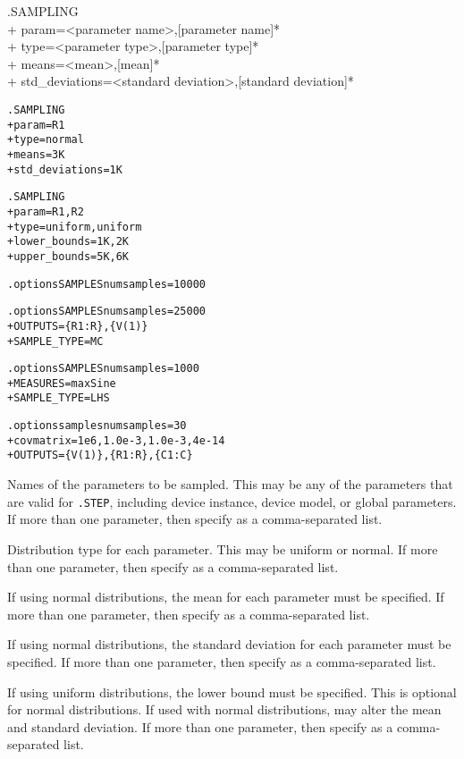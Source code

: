 \begin{Command}
\format
.SAMPLING  \\
+ param=<parameter name>,[parameter name]*  \\
+ type=<parameter type>,[parameter type]*  \\
+ means=<mean>,[mean]*  \\
+ std\_deviations=<standard deviation>,[standard deviation]* 

\examples
\begin{alltt}
.SAMPLING
+ param=R1
+ type=normal
+ means=3K
+ std\_deviations=1K

.SAMPLING
+ param=R1,R2
+ type=uniform,uniform
+ lower\_bounds=1K,2K
+ upper\_bounds=5K,6K

.options SAMPLES numsamples=10000

.options SAMPLES numsamples=25000
+ OUTPUTS=\{R1:R\},\{V(1)\}
+ SAMPLE\_TYPE=MC

.options SAMPLES numsamples=1000
+ MEASURES=maxSine
+ SAMPLE\_TYPE=LHS

.options samples numsamples=30
+ covmatrix=1e6,1.0e-3,1.0e-3,4e-14
+ OUTPUTS=\{V(1)\},\{R1:R\},\{C1:C\}
\end{alltt}

\arguments

\begin{Arguments}

Names of the parameters to be sampled.  This may be any of the parameters that are valid 
for \verb|.STEP|, including device instance, device model, or global parameters.  
  If more than one parameter, then specify as a comma-separated list.

Distribution type for each parameter.  This may be uniform or normal.  
  If more than one parameter, then specify as a comma-separated list.

If using normal distributions, the mean for each parameter must be specified.
  If more than one parameter, then specify as a comma-separated list.

If using normal distributions, the standard deviation for each parameter must be specified.
  If more than one parameter, then specify as a comma-separated list.

If using uniform distributions, the lower bound must be specified.  This is optional for normal distributions.  
  If used with normal distributions, may alter the mean and standard deviation.
  If more than one parameter, then specify as a comma-separated list.


\end{Arguments}
\end{Command}
